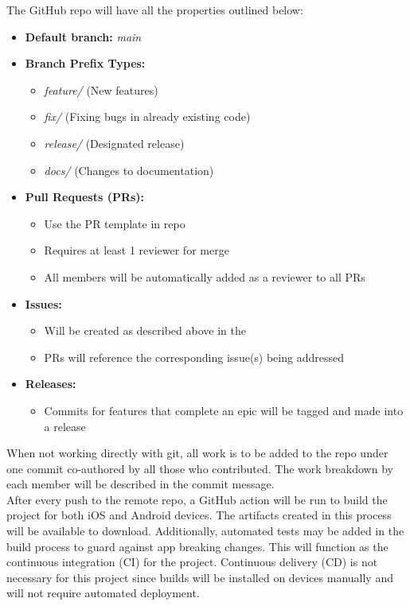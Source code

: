 \documentclass{article}
\begin{document}
\begin{flushleft}
  The GitHub repo will have all the properties outlined below:
\end{flushleft}

\begin{itemize}
    \item \textbf{Default branch:} \textit{main}
    \item \textbf{Branch Prefix Types:}
    \begin{itemize}
        \item \textit{feature/} (New features)
        \item \textit{fix/} (Fixing bugs in already existing code)
        \item \textit{release/} (Designated release)
        \item \textit{docs/} (Changes to documentation)
    \end{itemize}
    \item \textbf{Pull Requests (PRs):}
    \begin{itemize}
        \item Use the PR template in repo
        \item Requires at least 1 reviewer for merge
        \item All members will be automatically added as a reviewer to all PRs
    \end{itemize}
    \item \textbf{Issues:}
    \begin{itemize}
        \item Will be created as described above in the 
        \item PRs will reference the corresponding issue(s) being addressed
    \end{itemize}
    \item \textbf{Releases:}
    \begin{itemize}
        \item Commits for features that complete an epic will be tagged and made into a release
    \end{itemize}
\end{itemize}

When not working directly with git, all work is to be added to the repo under one commit co-authored by all those who contributed. The work breakdown by each member will be described in the commit message. \\

After every push to the remote repo, a GitHub action will be run to build the project for both iOS and Android devices. The artifacts created in this process will be available to download. Additionally, automated tests may be added in the build process to guard against app breaking changes. This will function as the continuous integration (CI) for the project. Continuous delivery (CD) is not necessary for this project since builds will be installed on devices manually and will not require automated deployment. 
\end{document}
